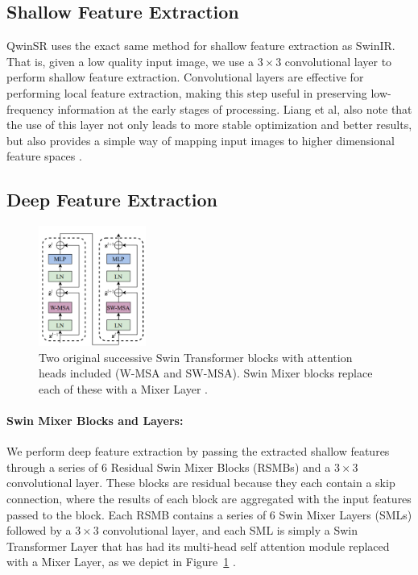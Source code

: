 \documentclass{article}
\begin{document}
\subsection{Shallow Feature Extraction}

QwinSR uses the exact same method for shallow feature extraction as SwinIR. That is, given a low quality input image, we use a $3 \times 3$ convolutional layer to perform shallow feature extraction. Convolutional layers are effective for performing local feature extraction, making this step useful in preserving low-frequency information at the early stages of processing. Liang et al, also note that the use of this layer not only leads to more stable optimization and better results, but also provides a simple way of mapping input images to higher dimensional feature spaces \citep{SwinIR}.

\subsection{Deep Feature Extraction}

\begin{figure}
    \centering
    \includegraphics[width=100pt]{swin-transformer-block.png}
    \caption{Two original successive Swin Transformer blocks with attention heads included (W-MSA and SW-MSA). Swin Mixer blocks replace each of these with a Mixer Layer \citep{SwinTransformer}.}
    \label{fig:transformer}
\end{figure}

\paragraph{Swin Mixer Blocks and Layers:} We perform deep feature extraction by passing the extracted shallow features through a series of 6 Residual Swin Mixer Blocks (RSMBs) and a $3 \times 3$ convolutional layer. These blocks are residual because they each contain a skip connection, where the results of each block are aggregated with the input features passed to the block. Each RSMB contains a series of 6 Swin Mixer Layers (SMLs) followed by a $3 \times 3$ convolutional layer, and each SML is simply a Swin Transformer Layer that has had its multi-head self attention module replaced with a Mixer Layer, as we depict in Figure~\ref{fig:transformer} \citep{MLPMixer,SwinTransformer}.
\end{document}
